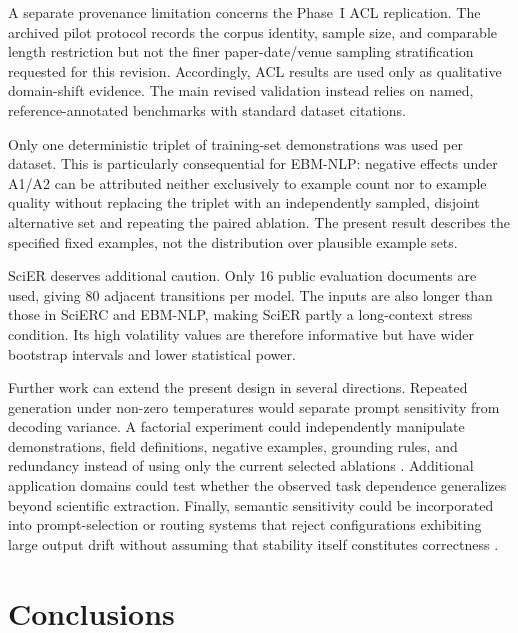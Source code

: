 \documentclass[fleqn,10pt]{wlscirep-authoryear}
\begin{document}
A separate provenance limitation concerns the Phase~I ACL replication. The
archived pilot protocol records the corpus identity, sample size, and comparable
length restriction but not the finer paper-date/venue sampling stratification
requested for this revision. Accordingly, ACL results are used only as qualitative
domain-shift evidence. The main revised validation instead relies on named,
reference-annotated benchmarks with standard dataset citations.

Only one deterministic triplet of training-set demonstrations was used per
dataset. This is particularly consequential for EBM-NLP: negative effects under
A1/A2 can be attributed neither exclusively to example count nor to example
quality without replacing the triplet with an independently sampled, disjoint
alternative set and repeating the paired ablation. The present result describes
the specified fixed examples, not the distribution over plausible example sets.

SciER deserves additional caution. Only 16 public evaluation documents are used,
giving 80 adjacent transitions per model. The inputs are also longer than those in
SciERC and EBM-NLP, making SciER partly a long-context stress condition. Its high
volatility values are therefore informative but have wider bootstrap intervals and
lower statistical power.

Further work can extend the present design in several directions. Repeated
generation under non-zero temperatures would separate prompt sensitivity from
decoding variance. A factorial experiment could independently manipulate
demonstrations, field definitions, negative examples, grounding rules, and
redundancy instead of using only the current selected ablations
\cite{min2022demonstrations,yoo2022groundtruth,mo2024cicl}.
Additional
application domains could test whether the observed task dependence generalizes
beyond scientific extraction. Finally, semantic sensitivity could be incorporated
into prompt-selection or routing systems that reject configurations exhibiting
large output drift without assuming that stability itself constitutes correctness
\cite{lu2024promptSensitivity,chatterjee2024posix,zhuo2024prosa}.

\section{Conclusions}
\label{sec:conclusions}
\end{document}
